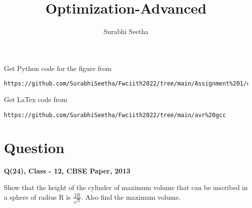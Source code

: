 \documentclass[journal,12pt,twocolumn]{IEEEtran}
\begin{document}
\makeatother
\let\StandardTheFigure\thefigure
\let\vec\mathbf
\renewcommand{\thefigure}{\theproblem}
\def\putbox#1#2#3{\makebox[0in][l]{\makebox[#1][l]{}\raisebox{\baselineskip}[0in][0in]{\raisebox{#2}[0in][0in]{#3}}}}
     \def\rightbox#1{\makebox[0in][r]{#1}}
     \def\centbox#1{\makebox[0in]{#1}}
     \def\topbox#1{\raisebox{-\baselineskip}[0in][0in]{#1}}
     \def\midbox#1{\raisebox{-0.5\baselineskip}[0in][0in]{#1}}
\vspace{3cm}
\title{\textbf{Optimization-Advanced} }
\author{Surabhi Seetha}
\maketitle
\newpage
\bigskip
\renewcommand{\thefigure}{\theenumi}
\renewcommand{\thetable}{\theenumi}
Get Python code for the figure from 
\begin{lstlisting}
https://github.com/SurabhiSeetha/Fwciith2022/tree/main/Assignment%201/codes/src
\end{lstlisting}
Get LaTex code from
\begin{lstlisting}
https://github.com/SurabhiSeetha/Fwciith2022/tree/main/avr%20gcc
\end{lstlisting}
%
\section{Question}
\centering
\textbf{Q(24), Class - 12, CBSE Paper, 2013}\\
\vspace{0.5cm}
\raggedright{Show that the height of the cylinder of maximum volume that can be inscribed in a sphere of radius R is $\frac{2R}{\sqrt{3}} $. Also find the maximum volume.}\\
\centering
\end{document}
